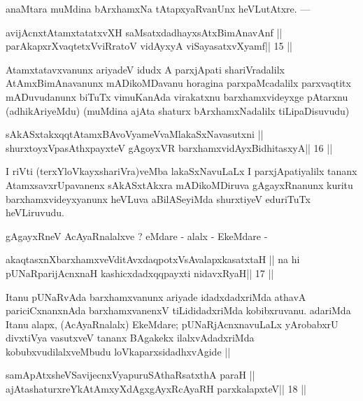  
\begin{artha}
anaMtara muMdina bArxhamxNa tAtapxyaRvanUnx heVLutAtxre. ---
\end{artha}

\begin{shl}
avijAcnxtAtamxtatatxvXH saMsatxdadhayxsAtxBimAnavAnf ||
parAkapxrXvaqtetxVviRratoV vidAyxyA viSayasatxvXyamf\hfill || 15 ||
\end{shl}

\begin{artha}
Atamxtatavxvanunx ariyadeV idudx A parxjApati shariVradalilx 
AtAmxBimAnavanunx mADikoMDavanu horagina parxpaMcadalilx parxvaqtitx mADuvudanunx biTuTx vimuKanAda virakatxnu barxhamxvideyxge pAtarxnu (adhikAriyeMdu) (muMdina ajAta shaturx bArxhamxNadalilx tiLipaDisuvudu)
\end{artha}

\begin{shl}
sAkASxtakxqqtAtamxBAvoV\s yameVvaMlakaSxNavasutxni ||
shurxtoyxVpasAthxpayxteV gAgoyxVR barxhamxvidAyxBidhitasxyA\hfill || 16 ||
\end{shl}

\begin{artha}
I riVti (terxYloVkayxshariVra)veMba lakaSxNavuLaLx I parxjApatiyalilx 
tananx AtamxsavxrUpavanenx sAkASxtAkxra mADikoMDiruva gAgayxRnanunx kuritu barxhamxvideyxyanunx heVLuva aBilASeyiMda shurxtiyeV eduriTuTx heVLiruvudu.
\end{artha} 
 
\begin{artha}
gAgayxRneV AcAyaRnalalxve ? eMdare - alalx - EkeMdare -
\end{artha}

\begin{shl}
akaqtasxnXbarxhamxveVditAvxdaqpotxV\s sAvalapxkasatxtaH ||
na hi pUNaRparijAcnxnaH kashicxdadxqqpayxti nidavxRyaH\hfill || 17 ||
\end{shl}

\begin{artha}
Itanu pUNaRvAda barxhamxvanunx ariyade idadxdadxriMda athavA pariciCxnanxnAda barxhamxvanenxV tiLididadxriMda kobibxruvanu. adariMda Itanu alapx, (AcAyaRnalalx) EkeMdare; pUNaRjAcnxnavuLaLx yArobabxrU divxtiVya vasutxveV tananx BAgakekx ilalxvAdadxriMda kobubxvudilalxveMbudu loVkaparxsidadhxvAgide ||
\end{artha}

\begin{shl}
samApAtxsheVSavijecnxVyapuruSAthaRsatxthA paraH ||
ajAtashaturxreYkAtAmxyXdAgxgAyxRcAyaRH parxkalapxteV\hfill || 18 ||
\end{shl}

